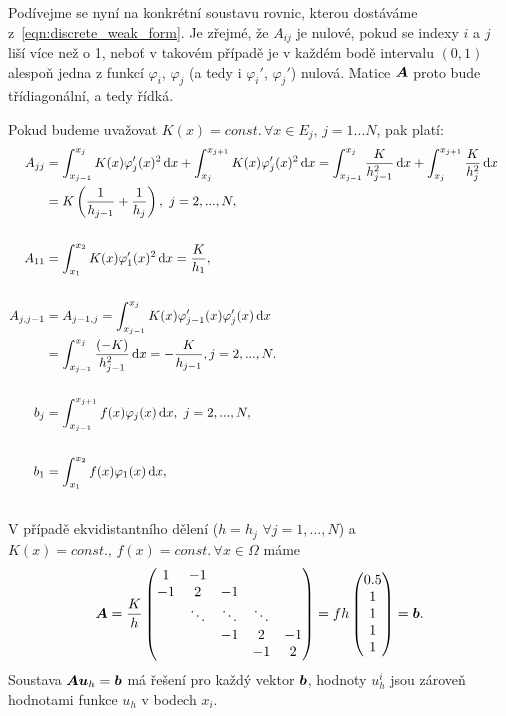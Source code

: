 Podívejme se nyní na konkrétní soustavu rovnic, kterou dostáváme z~\eqref{eqn:discrete_weak_form}.
Je zřejmé, že $A_{ij}$ je nulové, pokud se indexy $i$ a $j$ liší více než o 1, neboť v takovém případě je v každém bodě intervalu $(0,1)$ alespoň jedna z funkcí $\varphi_i$, $\varphi_j$ (a tedy i $\varphi_i'$, $\varphi_j'$) nulová. Matice $\mathbf{\boldsymbol{A}}$ proto bude třídiagonální, a tedy řídká.

Pokud budeme uvažovat $K(x) = const.\, \forall x\in E_j,\, j = 1\ldots N$, pak platí:
\begin{align*}
A_{jj} &= \int_{x_{j-1}}^{x_j} K(x)\varphi_j'(x)^2\,{\rm d} x + \int_{x_j}^{x_{j+1}} K(x) \varphi_j'(x)^2\,{\rm d} x
= \int_{x_{j-1}}^{x_j}\frac{K}{h_{j-1}^2}\,{\rm d} x + \int_{x_j}^{x_{j+1}}\frac{K}{h_j^2}\,{\rm d} x\\
&= K\left(\frac1{h_{j-1}} + \frac1{h_j}\right),~j=2,...,N,\\\\
A_{11} &= \int_{x_1}^{x_{2}} K(x) \varphi_1'(x)^2\,{\rm d} x
= \frac{K}{h_1},&\\\\
A_{j,j-1} &= A_{j-1,j} = \int_{x_{j-1}}^{x_j}K(x)\varphi_{j-1}'(x)\varphi_j'(x)\,{\rm d} x\\
&= \int_{x_{j-1}}^{x_j}\frac{(-K)}{h_{j-1}^2} \,{\rm d} x = -\frac{K}{h_{j-1}}, j=2,...,N.\\\\
b_j &= \int_{x_{j-1}}^{x_{j+1}} f(x)\varphi_j(x)\,{\rm d} x,~j=2,...,N,&\\\\
b_1 &= \int_{x_1}^{x_2} f(x)\varphi_1(x)\,{\rm d} x,&\\\\
\end{align*}
V případě ekvidistantního dělení ($h=h_j$ $\forall j=1,...,N$) a $K(x) = const.,\,f(x)=const.\, \forall x\in\Omega$ máme
\[
  \mathbf{\boldsymbol{A}} = \frac{K}{h}\begin{pmatrix}1 & -1 &&& \\-1 & 2 & -1&&\\&\ddots&\ddots&\ddots&\\&&-1 & 2 & -1\\&&& -1 & 2\end{pmatrix}
  = fh\begin{pmatrix}0.5\\1\\1\\1\\1\end{pmatrix}= \mathbf{\boldsymbol{b}}.
\]
Soustava $\mathbf{\boldsymbol{A}}\mathbf{\boldsymbol{u}}_h=\mathbf{\boldsymbol{b}}$ má řešení pro každý vektor $\mathbf{\boldsymbol{b}}$,
hodnoty $u_h^i$ jsou zároveň hodnotami funkce $u_h$ v bodech $x_i$.


